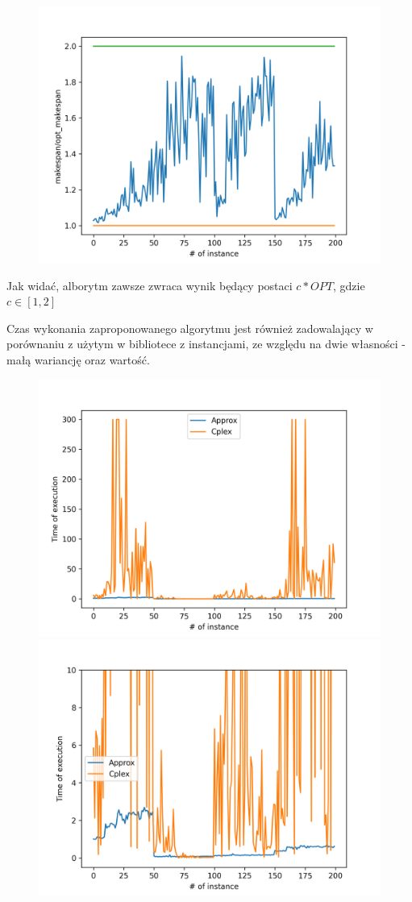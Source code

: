 \documentclass{article}
\begin{document}
\begin{figure}[H]
    \centering
    \includegraphics[scale=0.75]{quotients.png}
\end{figure}

Jak widać, alborytm zawsze zwraca wynik będący postaci $c * OPT$, gdzie $c \in [1,2]$

Czas wykonania zaproponowanego algorytmu jest również zadowalający w porównaniu z użytym w bibliotece z instancjami, ze względu na dwie własności - małą wariancję oraz wartość.

\begin{figure}[H]
    \includegraphics[scale=0.5]{times.png}
    \includegraphics[scale=0.5]{times_lim.png}
\end{figure}




\end{document}

